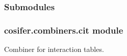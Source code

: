 \documentclass[letterpaper,10pt,english]{sphinxmanual}
\begin{document}
\subsubsection{Submodules}
\label{\detokenize{_modules/cosifer.combiners:submodules}}

\subsubsection{cosifer.combiners.cit module}
\label{\detokenize{_modules/cosifer.combiners:module-cosifer.combiners.cit}}\label{\detokenize{_modules/cosifer.combiners:cosifer-combiners-cit-module}}
Combiner for interaction tables.
\end{document}

